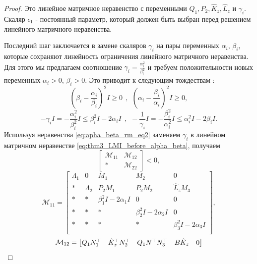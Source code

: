 \begin{proof}
Это линейное матричное неравенство с переменными ${Q}_1, {P}_2, \hat{{K}}_z,\hat{{L}}_z$ и $\gamma_i$. Скаляр $\epsilon_1$ - постоянный параметр, который должен быть выбран перед решением линейного матричного неравенства.

Последний шаг заключается в замене скаляров $\gamma_i$ на пары переменных $\alpha_i$, $\beta_i$, которые сохраняют линейность ограничения линейного матричного неравенства. Для этого мы предлагаем соотношение $\gamma_i=\frac{\alpha_i^2}{\beta_i^2}$ и требуем положительности новых переменных $\alpha_i>0$, $\beta_i>0$. Это приводит к следующим тождествам \cite{KHELOUFI2016}:
%
\begin{equation}
	\label{eq:apha_beta_rm_eq1}
	\left(\beta_i-\frac{\alpha_i}{\beta_i}\right)^2 {I} \geq 0 \ \ , \ \  \left(\alpha_i-\frac{\beta_i}{\alpha_i}\right)^2 {I} \geq 0,
\end{equation}
%
\begin{equation}
	\label{eq:apha_beta_rm_eq2}
	-\gamma_i {I} = -\frac{\alpha_i^2}{\beta_i^2}{I} \leq \beta_i^2{I}-2\alpha_i {I} \ \ , \ \  -\frac{1}{\gamma_i} {I} = -\frac{\beta_i^2}{\alpha_i^2}{I} \leq \alpha_i^2{I}-2\beta_i {I} .
\end{equation}
Используя неравенства \ref{eq:apha_beta_rm_eq2} заменяем $\gamma_i$ в линейном матричном неравенстве \ref{eq:thm3_LMI_before_alpha_beta}, получаем 
\begin{equation}
	\label{eq:thm3_final_LMI_before schur}
	\begin{bmatrix}
		\mathcal{M}_{11} & \mathcal{M}_{12} \\
		* & \mathcal{M}_{22}
	\end{bmatrix}<0,
\end{equation}
\begin{equation}
	\mathcal{M}_{11}= \begin{bmatrix}
	{\Lambda}_1 & 0 & {M}_1 & {M}_2&0  \\
		* & {\Lambda}_2 & {P}_2{M}_1 & {P}_2{M}_2 & \hat{{L}}_z{M}_3\\
		* & * & \beta_1^2{I}-2\alpha_1 {I} & 0&0\\
		* & * &*  & \beta_2^2{I}-2\alpha_2 {I}&0\\
		*& * & * &*  &\beta_3^2{I}-2\alpha_3 {I}\\
	\end{bmatrix},
\end{equation}
%
\begin{equation}
	\mathcal{M}_{12}= \begin{bmatrix}
		{Q}_1{N}_1^\top & \hat{{K}}_z^\top{N}_2^\top & {Q}_1 {N}^\top{N}_3^\top & {B}\hat{{K}}_z & 0\\

\end{bmatrix}
\end{equation}
\end{proof}
